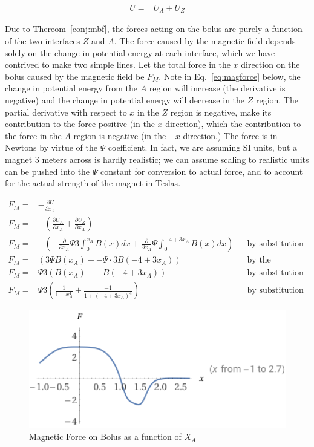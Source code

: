 \documentclass{asme2ej}
\begin{document}
\begin{align}
  U = & U_A + U_Z
\end{align}


Due to Thereom~\ref{conj:mbf}, the forces acting on the bolus are purely a function
of the two interfaces $Z$ and $A$.
The force caused by the magnetic field depends solely on the change in potential energy
at each interface, which we have contrived to make two simple lines.
Let the total force in the $x$ direction on the bolus caused by the magnetic
field be $F_M$. Note in Eq.~\ref{eq:magforce} below, the change in potential energy
from the $A$ region will increase (the derivative is negative) and
the change in potential energy will decrease in the $Z$ region.
The partial derivative with respect to $x$ in the $Z$ region is negative, make its contribution
to the force positive (in the $x$ direction), which the contribution to the force
in the $A$ region is negative (in the $-x$ direction.) The force is in Newtons by virtue
of the $\Psi$ coefficient. In fact, we are assuming SI units, but a magnet 3 meters across
is hardly realistic; we can assume scaling to realistic units can be pushed into the $\Psi$
constant for conversion to actual force, and to account for the actual strength of the magnet in Teslas.

\begin{align}
  F_M = & - \frac{\partial U}{\partial x_A} \\
  F_M = &- (\frac{\partial U_A}{\partial x_A} +  \frac{\partial U_Z}{\partial x_A}) \\
  F_M =  & - (- \frac{\partial }{\partial x_A}  \Psi 3\int_0^{x_A} B(x) dx +
  \frac{\partial }{\partial x_A}
 \Psi  \int_{0}^{ -4 + 3x_A} B(x) dx)
  && \text{by substitution} \\
  F_M =  & (3  \Psi B(x_A)  +
  - \Psi \cdot 3 B(-4 + 3x_A) ) && \text{by the Fundamental Theorem of Calculus} \\
  F_M =  &  \Psi 3 ( B(x_A)  +
   -B(-4 + 3x_A) ) && \text{by substitution} \\
  F_M =  & \Psi 3 (\frac{1}{1+x_A^4}  +
    \frac{-1}{1+(-4 + 3x_A)^4}  ) && \text{by substitution}
  \label{eq:magforce}
\end{align}


\begin{figure}
\centerline{\includegraphics[width=6in]{figure/F_MVsX_A.png}}
\caption{Magnetic Force on Bolus as a function of $X_A$}
\label{fig:forceVsX_A}
\end{figure}
\end{document}
